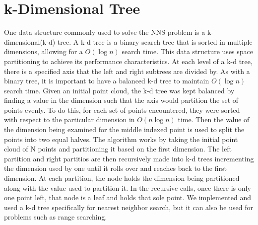 \documentclass[a4paper,12pt]{article}
\begin{document}
\section{k-Dimensional Tree}
One data structure commonly used to solve the NNS problem is a k-dimensional(k-d) tree.
A k-d tree is a binary search tree that is sorted in multiple dimensions, allowing
for a $O(\log n)$ search time.
This data structure uses space partitioning to achieve its performance characteristics.
At each level of a k-d tree, there is a specified axis that the left and right subtrees
are divided by.
As with a binary tree, it is important to have a balanced k-d tree to maintain $O(\log n)$
search time. Given an initial point cloud, the k-d tree was kept balanced by finding a
value in the dimension such that the axis would partition the set of points evenly. To do
this, for each set of points encountered, they were sorted with respect to the particular
dimension in $O(n \log n)$ time. Then the value of the dimension being examined for the
middle indexed point is used to split the points into two equal halves.
The algorithm works by taking the initial point cloud of N points and partitioning it
based on the first dimension. The left partition and right partitios are then recursively
made into k-d trees incrementing the dimension used by one until it rolls over and reaches
back to the first dimension. At each partition, the node holds the dimension being partitioned
along with the value used to partition it. In the recursive calls, once there is only one point
left, that node is a leaf and holds that sole point.
We implemented and used a k-d tree specifically for nearest neighbor search, but it can
also be used for problems such as range searching.
\end{document}
